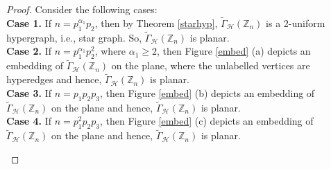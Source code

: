 \documentclass[11pt,a4paper]{article}
\theoremstyle{definition}
\theoremstyle{remark}
\begin{document}
	\begin{proof}
		Consider the following cases:\\
		\textbf{Case 1.} If $n=p_1^{\alpha_1}p_2$, then by Theorem \ref{starhyp},  $\tilde{\Gamma}_\mathcal{H}(\mathbb{Z}_n)$ is a 2-uniform hypergraph, i.e., star graph. So, $\tilde{\Gamma}_\mathcal{H}(\mathbb{Z}_n)$ is planar. \\
		\textbf{Case 2.} If $n=p_1^{\alpha_1}p_2^2$, where $\alpha_1 \geq 2$, then Figure \ref{embed} (a) depicts an embedding of  	$\tilde{\Gamma}_\mathcal{H}(\mathbb{Z}_n)$ on the plane, where the unlabelled vertices are hyperedges and hence, $\tilde{\Gamma}_\mathcal{H}(\mathbb{Z}_n)$ is planar.\\
	\noindent \textbf{Case 3.} If $n=p_1 p_2 p_3$, then Figure \ref{embed} (b) depicts an embedding of $\tilde{\Gamma}_\mathcal{H}(\mathbb{Z}_n)$ on the plane and hence, $\tilde{\Gamma}_\mathcal{H}(\mathbb{Z}_n)$ is planar.\\
\noindent\textbf{Case 4.} If $n=p_1^2 p_2 p_3$, then Figure \ref{embed} (c) depicts an embedding of $\tilde{\Gamma}_\mathcal{H}(\mathbb{Z}_n)$ on the plane and hence, $\tilde{\Gamma}_\mathcal{H}(\mathbb{Z}_n)$ is planar.\\
\begin{figure}[h]
	\centering{}
\end{figure}
\end{proof}
\end{document}

